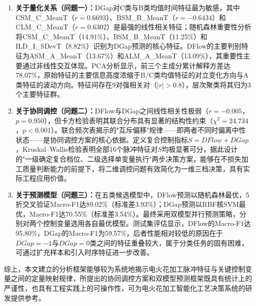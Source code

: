 \documentclass[UTF8,a4paper,12pt]{ctexart}
\begin{document}
\begin{enumerate}[label=(\arabic*),leftmargin=2em]
\item \textbf{关于量化关系（问题一）：}DGap对C类与B类均值时间特征最为敏感，其中CSM\_C\_MeanT（$r=0.6693$）、BSM\_B\_MeanT（$r=-0.6434$）和CLM\_C\_MeanT（$r=0.6302$）是最强的线性相关特征；随机森林重要性分析将CSM\_C\_MeanT（14.91\%）、BSM\_B\_MeanT（11.25\%）和ILD\_I\_SDevT（8.82\%）识别为DGap预测的核心特征。DFlow的主要判别特征为ASM\_A\_MeanT（13.67\%）和ALM\_A\_MeanT（13.09\%），其重要性主要通过非线性交互体现。PCA分析显示，前三个主成分累计解释方差达78.07\%，原始特征的主要信息高度浓缩于B/C类均值特征的对立变化方向与A类特征的波动方向。特征间存在9对强相关对（$|r|>0.8$），层次聚类将其归为3个主要特征群。

\item \textbf{关于协同调控（问题二）：}DFlow与DGap之间线性相关性极弱（$r=-0.005$，$p=0.950$），但卡方检验表明其联合分布具有显著的结构性约束（$\chi^2=24.734$，$p<0.001$）。联合频次表揭示的"互斥偏移"规律——即两者不同时偏离中性状态——是协同调控方案的核心依据。定义复合控制指标$S=DFlow+DGap$，Kruskal--Wallis检验表明全部16个脉冲特征对$S$均极显著可分，据此设计的"一级确定复合档位、二级选择单变量执行"两步决策方案，能够在不损失加工质量判断能力的前提下，将二维调控问题有效简化为一维三档决策，具有实际工程应用价值。

\item \textbf{关于预测模型（问题三）：}在五类候选模型中，DFlow预测以随机森林最优，5折交叉验证Macro-F1达89.02\%（标准差3.93\%）；DGap预测以RBF核SVM最优，Macro-F1达70.55\%（标准差3.54\%）。最终采用双模型并行预测策略，分别对两个控制变量选用各自最优模型。测试集评估显示，DFlow的Macro-F1达95.80\%，DGap的Macro-F1为59.57\%，后者性能相对较低的原因在于$DGap=-1$与$DGap=0$类之间的特征重叠较大，属于分类任务的固有困难，可通过扩充样本和引入时序特征进一步改善。
\end{enumerate}

综上，本文建立的分析框架能够较为系统地揭示电火花加工脉冲特征与关键控制变量之间的定量映射规律，所提出的协同调控方案和双模型预测框架既具有统计上的严谨性，也具有工程实践上的可操作性，可为电火花加工智能化工艺决策系统的研发提供参考。
\end{document}
